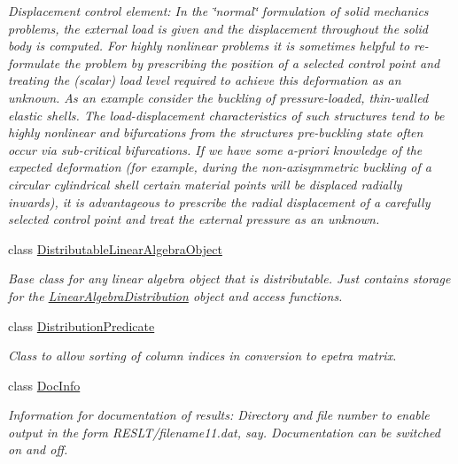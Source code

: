 \begin{DoxyCompactItemize}
\begin{DoxyCompactList}\small\item\em Displacement control element\+: In the \char`\"{}normal\char`\"{} formulation of solid mechanics problems, the external load is given and the displacement throughout the solid body is computed. For highly nonlinear problems it is sometimes helpful to re-\/formulate the problem by prescribing the position of a selected control point and treating the (scalar) load level required to achieve this deformation as an unknown. As an example consider the buckling of pressure-\/loaded, thin-\/walled elastic shells. The load-\/displacement characteristics of such structures tend to be highly nonlinear and bifurcations from the structure\textquotesingle{}s pre-\/buckling state often occur via sub-\/critical bifurcations. If we have some a-\/priori knowledge of the expected deformation (for example, during the non-\/axisymmetric buckling of a circular cylindrical shell certain material points will be displaced radially inwards), it is advantageous to prescribe the radial displacement of a carefully selected control point and treat the external pressure as an unknown. \end{DoxyCompactList}\item 
class \hyperlink{classoomph_1_1DistributableLinearAlgebraObject}{Distributable\+Linear\+Algebra\+Object}
\begin{DoxyCompactList}\small\item\em Base class for any linear algebra object that is distributable. Just contains storage for the \hyperlink{classoomph_1_1LinearAlgebraDistribution}{Linear\+Algebra\+Distribution} object and access functions. \end{DoxyCompactList}\item 
class \hyperlink{classoomph_1_1DistributionPredicate}{Distribution\+Predicate}
\begin{DoxyCompactList}\small\item\em Class to allow sorting of column indices in conversion to epetra matrix. \end{DoxyCompactList}\item 
class \hyperlink{classoomph_1_1DocInfo}{Doc\+Info}
\begin{DoxyCompactList}\small\item\em Information for documentation of results\+: Directory and file number to enable output in the form R\+E\+S\+L\+T/filename11.\+dat, say. Documentation can be switched on and off. \end{DoxyCompactList}\item 

\end{DoxyCompactItemize}

